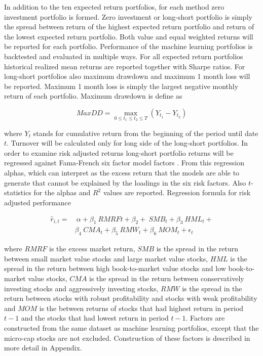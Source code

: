 \documentclass{article}
\begin{document}
In addition to the ten expected return portfolios, for each method zero investment portfolio is formed. Zero investment or long-short portfolio is simply the spread between return of the highest expected return portfolio and return of the lowest expected return portfolio. Both value and equal weighted returns will be reported for each portfolio. Performance of the machine learning portfolios is backtested and evaluated in multiple ways. For all expected return portfolios historical realized mean returns are reported together with Sharpe ratios. For long-short portfolios also maximum drawdown and maximum 1 month loss will be reported. Maximum 1 month loss is simply the largest negative monthly return of each portfolio. Maximum drawdown is define as

\begin{equation}
\label{eq:maxDD}
MaxDD = \max\limits_{0\leq t_1\leq t_2\leq T} (Y_{t_1} - Y_{t_2})
\end{equation}

where $Y_t$ stands for cumulative return from the beginning of the period until date $t$. Turnover will be calculated only for long side of the long-short portfolios. In order to examine risk adjusted returns long-short portfolio returns will be regressed against Fama-French \citeyear{FAMA20151} six factor model factors \footnotemark. From this regression alphas, which can interpret as the excess return that the models are able to generate that cannot be explained by the loadings in the six risk factors. Also $t$-statistics for the alphas and $R^2$ values are reported. Regression formula for risk adjusted performance

\begin{equation}
\label{eq:FFRegFormula}
\begin{split}
\hat r_{i, t} = 	& \ \alpha+ \beta_{1} \ RMRF{t} + \beta_{2} + \ SMB_{t} + \beta_{3} \ HML_{t} + \\
		&  \beta_{4} \ CMA_{t} +  \beta_{5} \ RMW_{t} + \beta_{6} \ MOM_{t} + \epsilon_{t}
\end{split}
\end{equation}

where $RMRF$ is the excess market return, $SMB$ is the spread in the return between small market value stocks and large market value stocks, $HML$ is the spread in the return between high book-to-market value stocks and low book-to-market value stocks, $CMA$ is the spread in the return between conservatively investing stocks and aggressively investing stocks, $RMW$ is the spread in the return between stocks with robust profitability and stocks with weak profitability and $MOM$ is the between returns of stocks that had highest return in period $t-1$ and the stocks that had lowest return in period $t-1$. Factors are constructed from the same dataset as machine learning portfolios, except that the micro-cap stocks are not excluded. Construction of these factors is described in more detail in Appendix.
\end{document}
